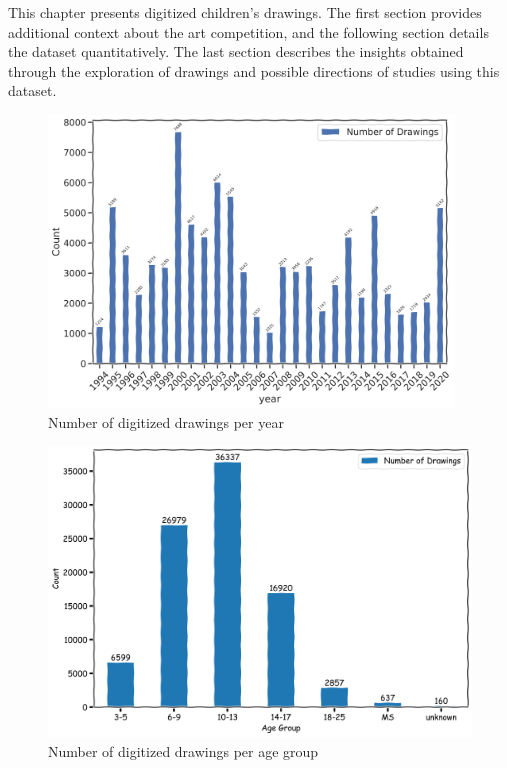 This chapter presents digitized children's drawings. The first section provides additional context about the art competition, and the following section details the dataset quantitatively. The last section describes the insights obtained through the exploration of drawings and possible directions of studies using this dataset.

\begin{figure}[ht]
\centering
\includegraphics[width=0.96\textwidth]{images/eda_drawings/year_wise_drawings_v2.png}
  \caption{Number of digitized drawings per year}
  \label{fig:drawing-per-year}
\end{figure}

\begin{figure}[ht]
\centering
\includegraphics[width=\textwidth]{images/eda_drawings/agegroup_wise_drawings_v2.png}
  \caption{Number of digitized drawings per age group}
  \label{fig:drawing-per-agegroup}
\end{figure}

